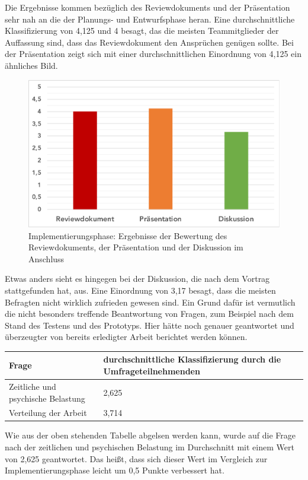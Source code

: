 \documentclass[../review_3.tex]{subfiles}
\begin{document}
Die Ergebnisse kommen bezüglich des Reviewdokuments und der Präsentation sehr nah an die der Planungs- und Entwurfsphase heran. Eine durchschnittliche Klassifizierung von 4,125 und 4 besagt, das die meisten Teammitglieder der Auffassung sind, dass das Reviewdokument den Ansprüchen genügen sollte. Bei der Präsentation zeigt sich mit einer durchschnittlichen Einordnung von 4,125 ein ähnliches Bild.
\begin{figure} [h]
    \centering
    \includegraphics[width = 0.7\linewidth, trim=5pt 5pt 5pt 5pt, clip]{img/umfrageimplement.pdf}
    \caption{Implementierungsphase: Ergebnisse der Bewertung des Reviewdokuments, der Präsentation und der Diskussion im Anschluss}
    \label{implement}
\end{figure}
Etwas anders sieht es hingegen bei der Diskussion, die nach dem Vortrag stattgefunden hat, aus. Eine Einordnung von 3,17 besagt, dass die meisten Befragten nicht wirklich zufrieden gewesen sind. Ein Grund dafür ist vermutlich die nicht besonders treffende Beantwortung von Fragen, zum Beispiel nach dem Stand des Testens und des Prototyps. Hier hätte noch genauer geantwortet und überzeugter von bereits erledigter Arbeit berichtet werden können.

\begin{longtable}[H]{p{} p{}}
    \toprule
    \textbf{Frage}                     & \textbf{durchschnittliche Klassifizierung durch die Umfrageteilnehmenden} \\ \midrule \endhead
    Zeitliche und psychische Belastung & 2,625                                                                     \\
    Verteilung der Arbeit              & 3,714                                                                       \\ \bottomrule
\end{longtable}

Wie aus der oben stehenden Tabelle abgelsen werden kann, wurde auf die Frage nach der zeitlichen und psychischen Belastung im Durchschnitt mit einem Wert von 2,625 geantwortet. Das heißt, dass sich dieser Wert im Vergleich zur Implementierungsphase leicht um 0,5 Punkte verbessert hat.
\end{document}
